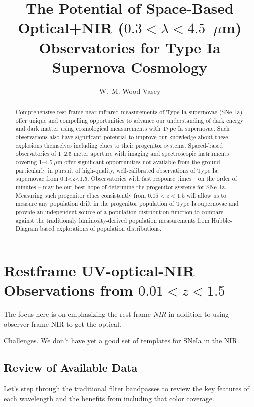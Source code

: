 \documentclass{aastex}
\newcommand{\sneia}{SNe~Ia}
\begin{document}
\title{The Potential of Space-Based Optical+NIR ($0.3<\lambda<4.5$~$\mu$m) Observatories for Type Ia Supernova Cosmology}
\author{W.~M. Wood-Vasey}

\begin{abstract}
    Comprehensive rest-frame near-infrared measurements of Type Ia supernovae (\sneia) offer unique and compelling opportunities to advance our understanding of dark energy and dark matter using cosmological measurements with Type Ia supernovae.  Such observations also have significant potential to improve our knowledge about these explosions themselves including clues to their progenitor systems.
    Spaced-based observatories of 1--2.5 meter aperture with imaging and spectroscopic instruments covering 1--4.5$~\mu$m offer significant opportunities not available from the ground, particularly in pursuit of high-quality, well-calibrated observations of Type Ia supernovae from 0.1<z<1.5.  Observatories with fast response times -- on the order of minutes -- may be our best hope of determine the progenitor systems for \sneia.  Measuring such progenitor clues consistently from $0.05<z<1.5$ will allow us to measure any population drift in the progenitor population of Type Ia supernovae and provide an independent source of a population distribution function to compare against the traditionaly luminosity-derived population measurements from Hubble-Diagram based explorations of population distributions.
\end{abstract}

\section{Restframe UV-optical-NIR Observations from $0.01<z<1.5$}

The focus here is on emphasizing the rest-frame {\em NIR} in addition to using observer-frame NIR to get the optical.

Challenges.  We don't have yet a good set of templates for SNeIa in the NIR.



\subsection{Review of Available Data}
Let's step through the traditional filter bandpasses to review the key features of each wavelength and the benefits from including that color coverage.
\end{document}

